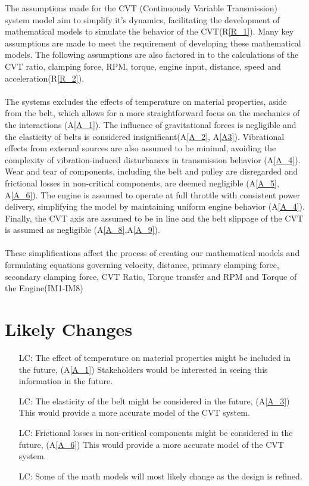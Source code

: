 \documentclass[12pt]{article}
\newcommand{\aref}[1]{A\ref{#1}}
\newcommand{\rref}[1]{R\ref{#1}}
\newcounter{lcnum} %
\begin{document}
The assumptions made for the CVT (Continuously Variable Transmission) system model aim to simplify it's dynamics, facilitating the development of mathematical models to simulate the behavior of the CVT(\rref{R_1}). 
Many key assumptions are made to meet the requirement of developing these mathematical models. The following assumptions are also factored in to the calculations of the CVT ratio, clamping force, RPM, torque, engine input, distance, speed and acceleration(\rref{R_2}). 
\\\\
\noindent The systems excludes the effects of temperature on material properties, aside from the belt, which allows for a more straightforward focus on the mechanics of the interactions (\aref{A_1}).
The influence of gravitational forces is negligible and the elasticity of belts is considered insignificant(\aref{A_2}, \aref{A3}). 
Vibrational effects from external sources are also assumed to be minimal, avoiding the complexity of vibration-induced disturbances in transmission behavior (\aref{A_4}).
Wear and tear of components, including the belt and pulley are disregarded and frictional losses in non-critical components, are deemed negligible (\aref{A_5}, \aref{A_6}). 
The engine is assumed to operate at full throttle with consistent power delivery, simplifying the model by maintaining uniform engine behavior (\aref{A_4}).
Finally, the CVT axis are assumed to be in line and the belt slippage of the CVT is assumed as negligible (\aref{A_8},\aref{A_9}). 
\\\\
\noindent These simplifications affect the process of creating our mathematical models and formulating equations governing velocity, distance, primary clamping force, secondary clamping force, CVT Ratio, Torque transfer and RPM and Torque of the Engine(IM1-IM8)

\section{Likely Changes}    

\noindent \begin{itemize}

\item[LC\refstepcounter{lcnum}\thelcnum\label{LC_1}:] The effect of temperature on material properties might be included in the future, (A\ref{A_1}) Stakeholders would be interested in seeing this information in the future.
\item[LC\refstepcounter{lcnum}\thelcnum\label{LC_2}:] The elasticity of the belt might be considered in the future, (A\ref{A_3}) This would provide a more accurate model of the CVT system.
\item[LC\refstepcounter{lcnum}\thelcnum\label{LC_3}:] Frictional losses in non-critical components might be considered in the future, (A\ref{A_6}) This would provide a more accurate model of the CVT system.
\item[LC\refstepcounter{lcnum}\thelcnum\label{LC_4}:] Some of the math models will most likely change as the design is refined.

\end{itemize}
\end{document}
